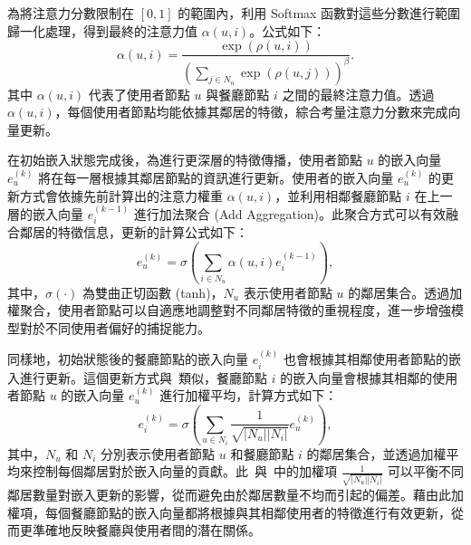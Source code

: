     為將注意力分數限制在 $[0,1]$ 的範圍內，利用 Softmax 函數對這些分數進行範圍歸一化處理，得到最終的注意力值 $\alpha(u, i)$。公式如下： \begin{equation} \alpha(u, i) = \frac{\exp(\rho(u, i))}{\left(\sum_{j \in N_u}\exp(\rho(u, j))\right)^{\beta}}. \end{equation} 其中 $\alpha(u, i)$ 代表了使用者節點 $u$ 與餐廳節點 $i$ 之間的最終注意力值。透過~$\alpha(u, i)$，每個使用者節點均能依據其鄰居的特徵，綜合考量注意力分數來完成向量更新。


    在初始嵌入狀態完成後，為進行更深層的特徵傳播，使用者節點 $u$ 的嵌入向量 $e_u^{(k)}$ 將在每一層根據其鄰居節點的資訊進行更新。使用者的嵌入向量 $e_u^{(k)}$ 的更新方式會依據先前計算出的注意力權重 $\alpha(u, i)$，並利用相鄰餐廳節點 $i$ 在上一層的嵌入向量 $e_i^{(k-1)}$ 進行加法聚合 (Add Aggregation)。此聚合方式可以有效融合鄰居的特徵信息，更新的計算公式如下： 
    \begin{equation} 
        e_u^{(k)} = \sigma\left(\sum_{i \in N_u} \alpha(u, i)e_i^{(k-1)}\right), 
    \end{equation} 
    其中，$\sigma(\cdot)$ 為雙曲正切函數 (tanh)，$N_u$ 表示使用者節點 $u$ 的鄰居集合。透過加權聚合，使用者節點可以自適應地調整對不同鄰居特徵的重視程度，進一步增強模型對於不同使用者偏好的捕捉能力。

    同樣地，初始狀態後的餐廳節點的嵌入向量 $e_i^{(k)}$ 也會根據其相鄰使用者節點的嵌入進行更新。這個更新方式與~類似，餐廳節點 $i$ 的嵌入向量會根據其相鄰的使用者節點 $u$ 的嵌入向量 $e_u^{(k)}$ 進行加權平均，計算方式如下： 
    \begin{equation} e_i^{(k)} = \sigma \left(\sum_{u \in N_i} \frac{1}{\sqrt{\vert N_u \vert \vert N_i \vert}} e_u^{(k)}\right), 
        \label{eq-e_i} 
    \end{equation} 其中，$N_u$ 和 $N_i$ 分別表示使用者節點 $u$ 和餐廳節點 $i$ 的鄰居集合，並透過加權平均來控制每個鄰居對於嵌入向量的貢獻。此~與~中的加權項 $\frac{1}{\sqrt{\vert N_u \vert \vert N_i \vert}}$ 可以平衡不同鄰居數量對嵌入更新的影響，從而避免由於鄰居數量不均而引起的偏差。藉由此加權項，每個餐廳節點的嵌入向量都將根據與其相鄰使用者的特徵進行有效更新，從而更準確地反映餐廳與使用者間的潛在關係。

